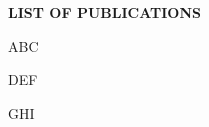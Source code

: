 \begin{center}\Large{\textbf{LIST OF PUBLICATIONS}}\end{center}
\vspace{1cm}
\begin{etaremune}
    \item ABC
    
    \item DEF
    
    \item GHI   
\end{etaremune}